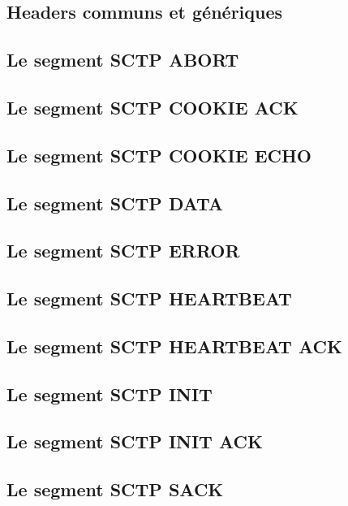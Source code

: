 \documentclass[a4paper,11pt]{report}
\begin{document}
\subsection{Headers communs et génériques}

\subsection{Le segment SCTP ABORT}

\subsection{Le segment SCTP COOKIE ACK}

\subsection{Le segment SCTP COOKIE ECHO}

\subsection{Le segment SCTP DATA}

\subsection{Le segment SCTP ERROR}

\subsection{Le segment SCTP HEARTBEAT}

\subsection{Le segment SCTP HEARTBEAT ACK}

\subsection{Le segment SCTP INIT}

\subsection{Le segment SCTP INIT ACK}

\subsection{Le segment SCTP SACK}
\end{document}
